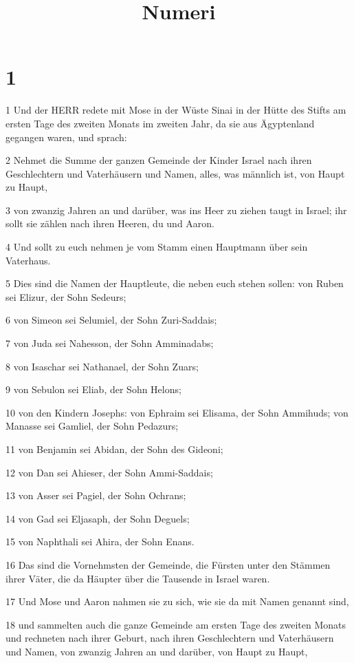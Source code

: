

\title{Numeri}


\chapter{1}

\par 1 Und der HERR redete mit Mose in der Wüste Sinai in der Hütte des Stifts am ersten Tage des zweiten Monats im zweiten Jahr, da sie aus Ägyptenland gegangen waren, und sprach:
\par 2 Nehmet die Summe der ganzen Gemeinde der Kinder Israel nach ihren Geschlechtern und Vaterhäusern und Namen, alles, was männlich ist, von Haupt zu Haupt,
\par 3 von zwanzig Jahren an und darüber, was ins Heer zu ziehen taugt in Israel; ihr sollt sie zählen nach ihren Heeren, du und Aaron.
\par 4 Und sollt zu euch nehmen je vom Stamm einen Hauptmann über sein Vaterhaus.
\par 5 Dies sind die Namen der Hauptleute, die neben euch stehen sollen: von Ruben sei Elizur, der Sohn Sedeurs;
\par 6 von Simeon sei Selumiel, der Sohn Zuri-Saddais;
\par 7 von Juda sei Nahesson, der Sohn Amminadabs;
\par 8 von Isaschar sei Nathanael, der Sohn Zuars;
\par 9 von Sebulon sei Eliab, der Sohn Helons;
\par 10 von den Kindern Josephs: von Ephraim sei Elisama, der Sohn Ammihuds; von Manasse sei Gamliel, der Sohn Pedazurs;
\par 11 von Benjamin sei Abidan, der Sohn des Gideoni;
\par 12 von Dan sei Ahieser, der Sohn Ammi-Saddais;
\par 13 von Asser sei Pagiel, der Sohn Ochrans;
\par 14 von Gad sei Eljasaph, der Sohn Deguels;
\par 15 von Naphthali sei Ahira, der Sohn Enans.
\par 16 Das sind die Vornehmsten der Gemeinde, die Fürsten unter den Stämmen ihrer Väter, die da Häupter über die Tausende in Israel waren.
\par 17 Und Mose und Aaron nahmen sie zu sich, wie sie da mit Namen genannt sind,
\par 18 und sammelten auch die ganze Gemeinde am ersten Tage des zweiten Monats und rechneten nach ihrer Geburt, nach ihren Geschlechtern und Vaterhäusern und Namen, von zwanzig Jahren an und darüber, von Haupt zu Haupt,
